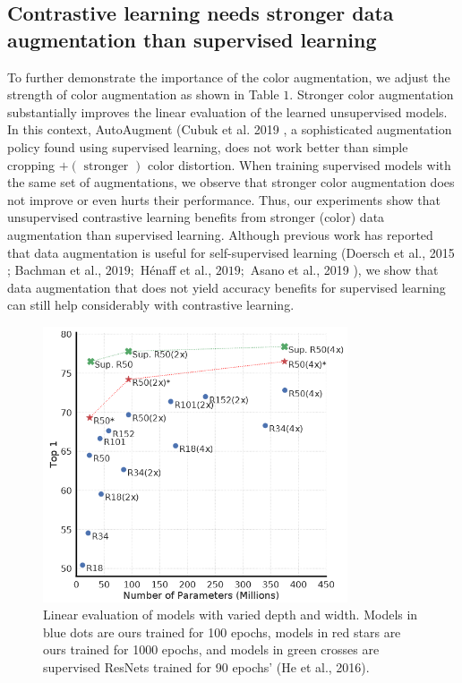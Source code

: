 \documentclass[]{IEEEtran}
\begin{document}
\subsection{Contrastive learning needs stronger data augmentation than supervised learning}
 
 To further demonstrate the importance of the color augmentation, we adjust the strength of color augmentation as shown in Table $1 .$ Stronger color augmentation substantially improves the linear evaluation of the learned unsupervised models. In this context, AutoAugment (Cubuk et al. 2019 , a sophisticated augmentation policy found using supervised learning, does not work better than simple cropping
$+(\text { stronger })$ color distortion. When training supervised models with the same set of augmentations, we observe that stronger color augmentation does not improve or even hurts their performance. Thus, our experiments show that unsupervised contrastive learning benefits from stronger (color) data augmentation than supervised learning. Although previous work has reported that data augmentation is useful for self-supervised learning (Doersch et al., 2015 ; Bachman et al., $2019 ;$ Hénaff et al., $2019 ;$ Asano et al., 2019 ), we show that data augmentation that does not yield accuracy benefits for supervised learning can still help considerably with contrastive learning.
 
 \begin{figure}[!h]
    \centering
    \includegraphics[width=9cm]{images/fig7.PNG}
    \caption{Linear evaluation of models with varied depth and width. Models in blue dots are ours trained for 100 epochs, models in red stars are ours trained for 1000 epochs, and models in green crosses are supervised ResNets trained for 90 epochs' (He et al., 2016).}
\label{fig7}
\end{figure}
 
\end{document}
